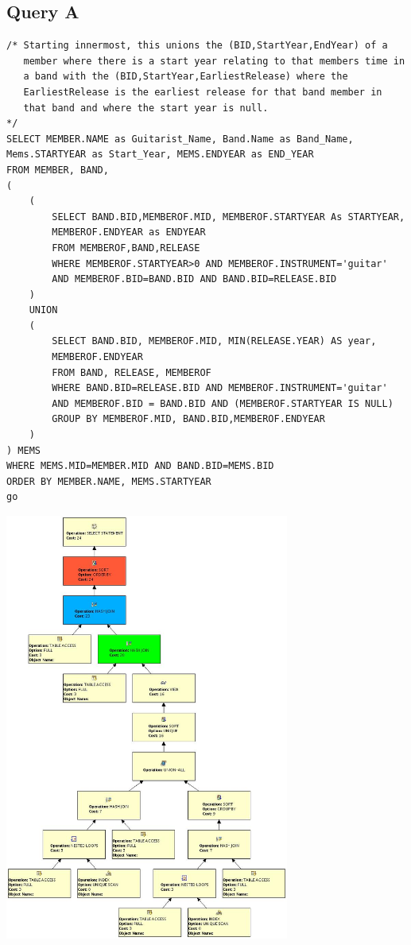 \documentclass{report}
\begin{document}
\subsection*{Query A}
\begin{verbatim}
/* Starting innermost, this unions the (BID,StartYear,EndYear) of a
   member where there is a start year relating to that members time in
   a band with the (BID,StartYear,EarliestRelease) where the
   EarliestRelease is the earliest release for that band member in
   that band and where the start year is null.
*/
SELECT MEMBER.NAME as Guitarist_Name, Band.Name as Band_Name,
Mems.STARTYEAR as Start_Year, MEMS.ENDYEAR as END_YEAR
FROM MEMBER, BAND,
(
    (
        SELECT BAND.BID,MEMBEROF.MID, MEMBEROF.STARTYEAR As STARTYEAR,
        MEMBEROF.ENDYEAR as ENDYEAR
        FROM MEMBEROF,BAND,RELEASE
        WHERE MEMBEROF.STARTYEAR>0 AND MEMBEROF.INSTRUMENT='guitar'
        AND MEMBEROF.BID=BAND.BID AND BAND.BID=RELEASE.BID
    )
    UNION
    (
        SELECT BAND.BID, MEMBEROF.MID, MIN(RELEASE.YEAR) AS year,
        MEMBEROF.ENDYEAR
        FROM BAND, RELEASE, MEMBEROF
        WHERE BAND.BID=RELEASE.BID AND MEMBEROF.INSTRUMENT='guitar' 
        AND MEMBEROF.BID = BAND.BID AND (MEMBEROF.STARTYEAR IS NULL)
        GROUP BY MEMBEROF.MID, BAND.BID,MEMBEROF.ENDYEAR
    )
) MEMS
WHERE MEMS.MID=MEMBER.MID AND BAND.BID=MEMS.BID
ORDER BY MEMBER.NAME, MEMS.STARTYEAR
go
\end{verbatim}
\includegraphics[width=0.7\textwidth]{Q3A}
\end{document}
